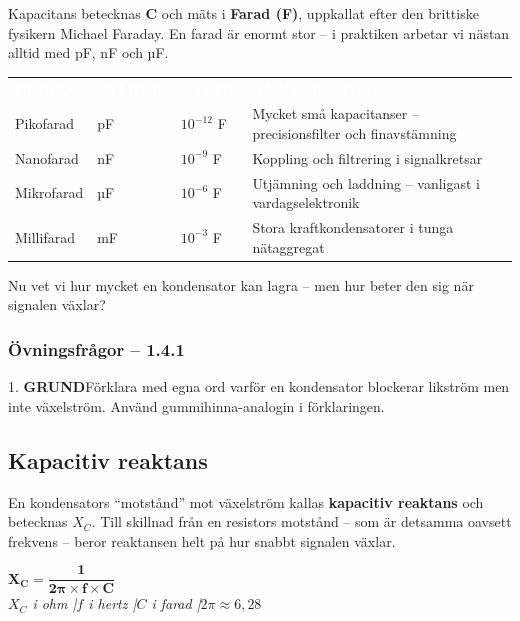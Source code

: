 \documentclass[a4paper,11pt,twoside]{book}
\newcommand{\tblhdr}[1]{\cellcolor{greydark}\textcolor{white}{\headingfont\bfseries\footnotesize\MakeUppercase{#1}}}
\newcommand{\qgrund}{\colorbox{greenpale}{\textcolor{greendark}{\headingfont\bfseries\tiny GRUND}}}
\begin{document}
Kapacitans betecknas \textbf{C} och mäts i \textbf{Farad (F)}, uppkallat efter den brittiske fysikern Michael Faraday. En farad är enormt stor -- i praktiken arbetar vi nästan alltid med pF, nF och µF.

\begin{center}
\begin{tabular}{llll}
\rowcolor{greydark}
\tblhdr{Prefix} & \tblhdr{Symbol} & \tblhdr{Värde} & \tblhdr{Används till} \\
Pikofarad & pF & $10^{-12}$ F & Mycket små kapacitanser -- precisionsfilter och finavstämning \\
\rowcolor{greylight}
Nanofarad & nF & $10^{-9}$ F & Koppling och filtrering i signalkretsar \\
Mikrofarad & µF & $10^{-6}$ F & Utjämning och laddning -- vanligast i vardagselektronik \\
\rowcolor{greylight}
Millifarad & mF & $10^{-3}$ F & Stora kraftkondensatorer i tunga nätaggregat \\
\end{tabular}
\end{center}

Nu vet vi hur mycket en kondensator kan lagra -- men hur beter den sig när signalen växlar?

\subsubsection*{Övningsfrågor -- 1.4.1}

\begin{qblock}{1.}
\qgrund\quad Förklara med egna ord varför en kondensator blockerar likström men inte växelström. Använd gummihinna-analogin i förklaringen.
\end{qblock}

\subsection{Kapacitiv reaktans}

En kondensators ``motstånd'' mot växelström kallas \textbf{kapacitiv reaktans} och betecknas $X_C$. Till skillnad från en resistors motstånd -- som är detsamma oavsett frekvens -- beror reaktansen helt på hur snabbt signalen växlar.

\begin{formulabox}
{\large$\mathbf{X_C = \dfrac{1}{2\pi \times f \times C}}$}\\[3mm]
{\small\normalfont\itshape $X_C$ i ohm \quad|\quad $f$ i hertz \quad|\quad $C$ i farad \quad|\quad $2\pi \approx 6{,}28$}
\end{formulabox}
\end{document}
